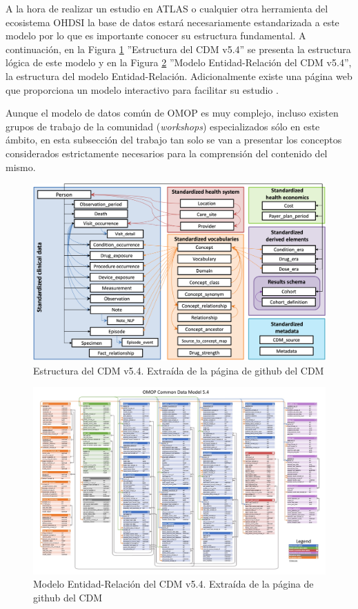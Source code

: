 A la hora de realizar un estudio en ATLAS o cualquier otra herramienta del ecosistema OHDSI la base de datos estará necesariamente estandarizada a este modelo por lo que es importante conocer su estructura fundamental. A continuación, en la Figura \ref{fig:cdm54} ''Estructura del CDM v5.4'' se presenta la estructura lógica de este modelo y en la Figura \ref{fig:cdm_ER} ''Modelo Entidad-Relación del CDM v5.4'', la estructura del modelo Entidad-Relación. Adicionalmente existe una página web que proporciona un modelo interactivo para facilitar su estudio \parencite{CDMinteractive}.

Aunque el modelo de datos común de OMOP es muy complejo, incluso existen grupos de trabajo de la comunidad (\textit{workshops}) especializados sólo en este ámbito, en esta subsección del trabajo tan solo se van a presentar los conceptos considerados estrictamente necesarios para la comprensión del contenido del mismo.

\begin{figure}[H]
    \centering
    \includegraphics[width=1\textwidth]{figures/cdm54.png}
     \caption{Estructura del CDM v5.4. Extraída de la página de github del CDM \parencite{gitPagesCMD}}
    \label{fig:cdm54}
\end{figure}

\begin{figure}[H]
    \centering
    \includegraphics[width=1\textwidth]{figures/cdm_ER.jpg}
     \caption{Modelo Entidad-Relación del CDM v5.4. Extraída de la página de github del CDM \parencite{gitPagesCMD}}
    \label{fig:cdm_ER}
\end{figure}

